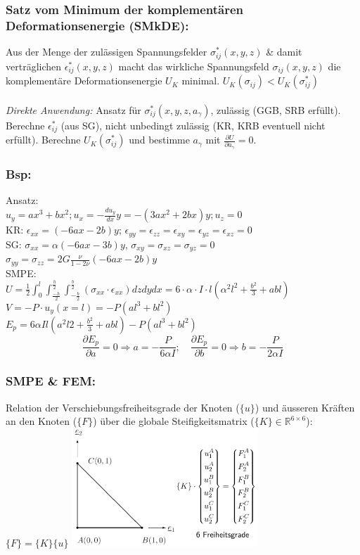 \documentclass[a4paper,10pt]{article}
\begin{document}
\begin{multicols}{3}
        \subsubsection{Satz vom Minimum der komplementären Deformationsenergie (SMkDE):}
            Aus der Menge der zulässigen Spannungsfelder $\sigma_{ij}^*(x,y,z)$ \& damit verträglichen $\epsilon_{ij}^*(x,y,z)$ macht das wirkliche Spannungsfeld $\sigma_{ij}(x,y,z)$ die komplementäre Deformationsenergie $U_K$ minimal. $U_K(\sigma_{ij}) < U_K(\sigma_{ij}^*)$\\\\
            \textit{Direkte Anwendung:} Ansatz für $\sigma_{ij}^*(x,y,z,a_\gamma)$, zulässig (GGB, SRB erfüllt). Berechne $\epsilon_{ij}^*$ (aus SG), nicht unbedingt zulässig (KR, KRB eventuell nicht erfüllt). Berechne $U_K(\sigma_{ij}^*)$ und bestimme $a_\gamma$ mit $\frac{\partial U}{\partial a_\gamma}=0$.
        \subsubsection{Bsp:}
            Ansatz:\\
            $u_y=ax^3+bx^2; u_x=-\frac{du_y}{dx}y= -(3ax^2+2bx)y; u_z = 0$\\
            KR: $\epsilon_{xx} =(-6ax-2b)y$; $\epsilon_{yy}=\epsilon_{zz}=\epsilon_{xy}=\epsilon_{yz} = \epsilon_{xz}=0$\\
            SG: $\sigma_{xx} = \alpha(-6ax-3b)y$, $\sigma_{xy}=\sigma_{xz}=\sigma_{yz}=0$\\ $\sigma_{yy}=\sigma_{zz}=2G\frac{\nu}{1-2\nu}(-6ax-2b)y$\\
            SMPE:\\
            $U=\frac{1}{2}\int_0^l\int_\frac{-h}{2}^\frac{h}{2}\int_{-\frac{b}{2}}^\frac{b}{2}(\sigma_{xx}\cdot\epsilon_{xx})dzdydx=6\cdot\alpha\cdot I\cdot l(\alpha^2l^2+\frac{b^2}{3}+abl)$\\
            $V=-P\cdot u_y(x=l)=-P(al^3+bl^2)$\\
            $E_p=6\alpha Il(a^2l2+\frac{b^2}{3}+abl)-P(al^3+bl^2)$
            \[\frac{\partial E_p}{\partial a} = 0 \Rightarrow a=-\frac{P}{6\alpha I};\quad\frac{\partial E_p}{\partial b} = 0 \Rightarrow b=-\frac{P}{2\alpha I}\]
        \subsubsection{SMPE \& FEM:}
            Relation der Verschiebungsfreiheitsgrade der Knoten ($\{u\}$) und äusseren Kräften an den Knoten ($\{F\}$) über die globale Steifigkeitsmatrix ($\{K\}\in\mathbb{R}^{6\times6}$): $\{F\}=\{K\}\{u\}$
            \includegraphics[width=70mm]{Dreieckselement}

\end{multicols}
\end{document}

